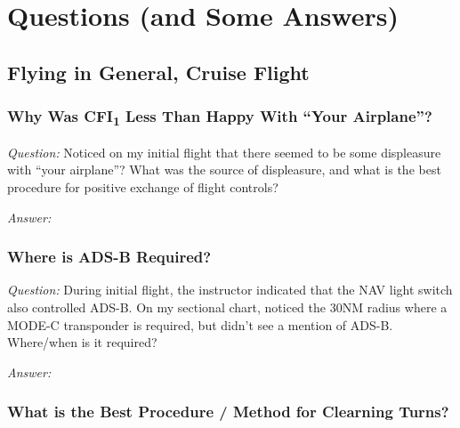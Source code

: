 \documentclass[letterpaper,10pt,titlepage]{article}
\begin{document}
\section{Questions (and Some Answers)}
\label{sqsa0}



\subsection{Flying in General, Cruise Flight}
\label{sqsa0:sfig0}


\subsubsection{Why Was CFI\textsubscript{1} Less Than Happy With ``Your Airplane''?}
\label{sqsa0:sfig0:slhy0}

\emph{Question:} Noticed on my initial flight that there seemed to be some
displeasure with ``your airplane''?  What was the source of displeasure, and what
is the best procedure for positive exchange of flight controls?

\noindent{}\emph{Answer:}


\subsubsection{Where is ADS-B Required?}
\label{sqsa0:sfig0:sads0}

\emph{Question:} During initial flight, the instructor indicated that the NAV
light switch also controlled ADS-B.  On my sectional chart, noticed the 30NM
radius where a MODE-C transponder is required, but didn't see a mention of ADS-B.
Where/when is it required?

\noindent{}\emph{Answer:}



\subsubsection{What is the Best Procedure / Method for Clearning Turns?}
\label{sqsa0:sfig0:sclt0}
\end{document}
